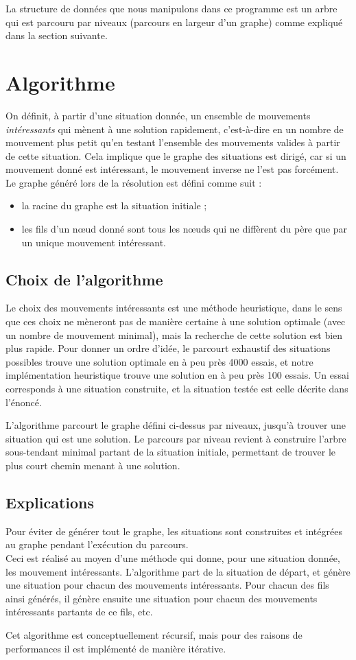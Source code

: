 \documentclass{article}
\begin{document}
        La structure de données que nous manipulons dans ce programme est un arbre qui est parcouru par niveaux (parcours en largeur d'un graphe)
        comme expliqué dans la section suivante.

\section{Algorithme}
		On définit, à partir d'une situation donnée, un ensemble de mouvements \textit{intéressants} qui mènent
		à une solution rapidement, c'est-à-dire en un nombre de mouvement plus petit qu'en testant l'ensemble des mouvements valides à
		partir de cette situation. Cela implique que le graphe des situations est dirigé, car si un mouvement donné est intéressant,
		le mouvement inverse ne l'est pas forcément. \\
		Le graphe généré lors de la résolution est défini comme suit :

        \begin{itemize}
			\item la racine du graphe est la situation initiale ;
			\item les fils d'un nœud donné sont tous les nœuds qui ne diffèrent du père que par un unique mouvement intéressant.
		\end{itemize}

    \subsection{Choix de l'algorithme}
		Le choix des mouvements intéressants est une méthode heuristique, dans le sens que ces choix ne mèneront pas de manière certaine
		à une solution optimale (avec un nombre de mouvement minimal), mais la recherche de cette solution est bien plus rapide.
		Pour donner un ordre d'idée, le parcourt exhaustif des situations possibles trouve une solution optimale en à peu près 4000 essais,
		et notre implémentation heuristique trouve une solution en à peu près 100 essais. Un essai corresponds à une situation construite,
		et la situation testée est celle décrite dans l'énoncé.

		L'algorithme parcourt le graphe défini ci-dessus par niveaux, jusqu'à trouver une situation qui est une solution.
		Le parcours par niveau revient à construire l'arbre sous-tendant minimal partant de la situation initiale,
		permettant de trouver le plus court chemin menant à une solution.

    \subsection{Explications}
		Pour éviter de générer tout le graphe, les situations sont construites et intégrées au graphe pendant l'exécution du parcours. \\
		Ceci est réalisé au moyen d'une méthode qui donne, pour une situation donnée, les mouvement intéressants.
		L'algorithme part de la situation de départ, et génère une situation pour chacun des mouvements intéressants.
		Pour chacun des fils ainsi générés, il génère ensuite une situation pour chacun des mouvements intéressants partants de ce fils, etc.

		Cet algorithme est conceptuellement récursif, mais pour des raisons de performances il est implémenté de manière itérative.
\end{document}
